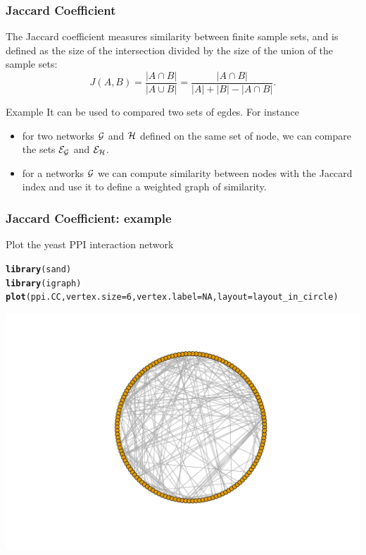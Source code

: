 \documentclass{beamer}\usepackage[]{graphicx}\usepackage[]{color}
\makeatletter
\newcommand{\hlnum}[1]{\textcolor[rgb]{0.686,0.059,0.569}{#1}}%
\newcommand{\hlstd}[1]{\textcolor[rgb]{0.345,0.345,0.345}{#1}}%
\newcommand{\hlkwc}[1]{\textcolor[rgb]{0.333,0.667,0.333}{#1}}%
\newcommand{\hlkwd}[1]{\textcolor[rgb]{0.737,0.353,0.396}{\textbf{#1}}}%
\newenvironment{kframe}{%
 \def\at@end@of@kframe{}%
 \ifinner\ifhmode%
  \def\at@end@of@kframe{\end{minipage}}%
  \begin{minipage}{\columnwidth}%
 \fi\fi%
 \def\FrameCommand##1{\hskip\@totalleftmargin \hskip-\fboxsep
 \colorbox{shadecolor}{##1}\hskip-\fboxsep
     \hskip-\linewidth \hskip-\@totalleftmargin \hskip\columnwidth}%
 \MakeFramed {\advance\hsize-\width
   \@totalleftmargin\z@ \linewidth\hsize
   \@setminipage}}%
 {\par\unskip\endMakeFramed%
 \at@end@of@kframe}
\newenvironment{knitrout}{}{} %
\makeatother
\begin{document}
\begin{frame}
  \frametitle{Jaccard Coefficient}

  \begin{definition}
The Jaccard coefficient \alert{measures similarity between finite sample sets}, and is defined as the size of the intersection divided by the size of the union of the sample sets:
  \[
  J(A,B)=\frac{|A\cap B|}{|A\cup B|} =\frac{|A\cap B|}{|A|+|B|-|A\cap B|}.
  \]
  \end{definition}

  \begin{block}{Example}
  It can be used to compared two sets of egdes. For instance
  \begin{itemize}
    \item for two networks $\mathcal{G}$ and $\mathcal{H}$ defined on the same set of node, we can compare the sets $\mathcal{E}_{\mathcal{G}}$ and $\mathcal{E}_{\mathcal{H}}$.
    \item for a networks $\mathcal{G}$ we can compute similarity between nodes with the Jaccard index and use it to define a weighted graph of similarity.
  \end{itemize}
  \end{block}

\end{frame}

\begin{frame}[fragile]
  \frametitle{Jaccard Coefficient: example}

Plot the yeast PPI interaction network
\begin{knitrout}\scriptsize
{}\color{fgcolor}\begin{kframe}
\begin{alltt}
\hlkwd{library}\hlstd{(sand)}
\hlkwd{library}\hlstd{(igraph)}
\hlkwd{plot}\hlstd{(ppi.CC,} \hlkwc{vertex.size}\hlstd{=}\hlnum{6}\hlstd{,} \hlkwc{vertex.label}\hlstd{=}\hlnum{NA}\hlstd{,} \hlkwc{layout}\hlstd{=layout_in_circle)}
\end{alltt}
\end{kframe}
\includegraphics[width=.8\textwidth]{figures/jaccard-1} 

\end{knitrout}

\end{frame}
\end{document}
